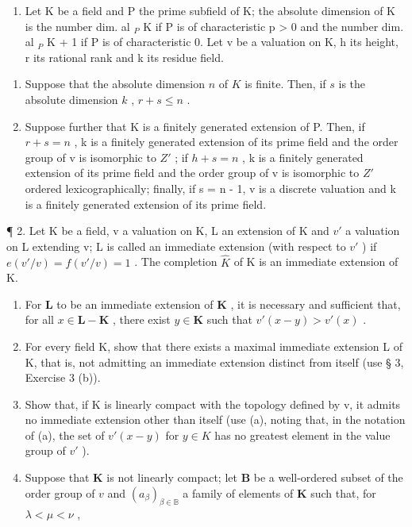 
\begin{enumerate}
\def\labelenumi{\arabic{enumi}.}
\tightlist
\item
  Let K be a field and P the prime subfield of K; the absolute dimension of K is the number dim. al \(_{P}\) K if P is of characteristic p \textgreater{} 0 and the number dim. al \(_{P}\) K + 1 if P is of characteristic 0. Let v be a valuation on K, h its height, r its rational rank and k its residue field.
\end{enumerate}

\begin{enumerate}
\def\labelenumi{(\alph{enumi})}
\item
  Suppose that the absolute dimension \(n\) of \(K\) is finite. Then, if \(s\) is the absolute dimension \(k\) , \(r + s \leqslant n\) .
\item
  Suppose further that K is a finitely generated extension of P. Then, if \(r + s = n\) , k is a finitely generated extension of its prime field and the order group of v is isomorphic to \(Z'\) ; if \(h + s = n\) , k is a finitely generated extension of its prime field and the order group of v is isomorphic to \(Z'\) ordered lexicographically; finally, if s = n - 1, v is a discrete valuation and k is a finitely generated extension of its prime field.
\end{enumerate}

¶ 2. Let K be a field, v a valuation on K, L an extension of K and \(v'\) a valuation on L extending v; L is called an immediate extension (with respect to \(v'\) ) if \(e(v'/v) = f(v'/v) = 1\) . The completion \(\hat{K}\) of K is an immediate extension of K.

\begin{enumerate}
\def\labelenumi{(\alph{enumi})}
\item
  For \(\mathbf{L}\) to be an immediate extension of \(\mathbf{K}\) , it is necessary and sufficient that, for all \(x \in \mathbf{L} - \mathbf{K}\) , there exist \(y \in \mathbf{K}\) such that \(v'(x - y) > v'(x)\) .
\item
  For every field K, show that there exists a maximal immediate extension L of K, that is, not admitting an immediate extension distinct from itself (use § 3, Exercise 3 (b)).
\item
  Show that, if K is linearly compact with the topology defined by v, it admits no immediate extension other than itself (use (a), noting that, in the notation of (a), the set of \(v'(x - y)\) for \(y \in K\) has no greatest element in the value group of \(v'\) ).
\item
  Suppose that \(\mathbf{K}\) is not linearly compact; let \(\mathbf{B}\) be a well-ordered subset of the order group of \(v\) and \((a_{\beta})_{\beta \in \mathbb{B}}\) a family of elements of \(\mathbf{K}\) such that, for \(\lambda < \mu < \nu\) ,
\end{enumerate}

